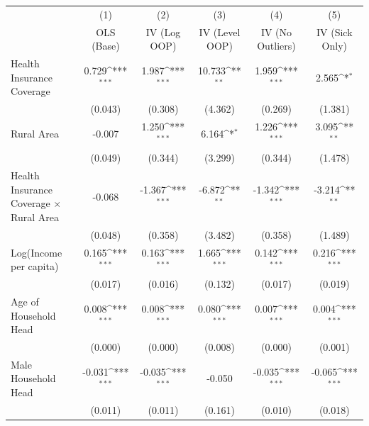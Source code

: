 {
\def\sym#1{\ifmmode^{#1}\else\(^{#1}\)\fi}
\begin{tabular}{l*{5}{c}}
\hline\hline
                    &\multicolumn{1}{c}{(1)}&\multicolumn{1}{c}{(2)}&\multicolumn{1}{c}{(3)}&\multicolumn{1}{c}{(4)}&\multicolumn{1}{c}{(5)}\\
                    &\multicolumn{1}{c}{OLS (Base)}&\multicolumn{1}{c}{IV (Log OOP)}&\multicolumn{1}{c}{IV (Level OOP)}&\multicolumn{1}{c}{IV (No Outliers)}&\multicolumn{1}{c}{IV (Sick Only)}\\
\hline
Health Insurance Coverage&       0.729\sym{***}&       1.987\sym{***}&      10.733\sym{**} &       1.959\sym{***}&       2.565\sym{*}  \\
                    &     (0.043)         &     (0.308)         &     (4.362)         &     (0.269)         &     (1.381)         \\
[1em]
Rural Area          &      -0.007         &       1.250\sym{***}&       6.164\sym{*}  &       1.226\sym{***}&       3.095\sym{**} \\
                    &     (0.049)         &     (0.344)         &     (3.299)         &     (0.344)         &     (1.478)         \\
[1em]
Health Insurance Coverage $\times$ Rural Area&      -0.068         &      -1.367\sym{***}&      -6.872\sym{**} &      -1.342\sym{***}&      -3.214\sym{**} \\
                    &     (0.048)         &     (0.358)         &     (3.482)         &     (0.358)         &     (1.489)         \\
[1em]
Log(Income per capita)&       0.165\sym{***}&       0.163\sym{***}&       1.665\sym{***}&       0.142\sym{***}&       0.216\sym{***}\\
                    &     (0.017)         &     (0.016)         &     (0.132)         &     (0.017)         &     (0.019)         \\
[1em]
Age of Household Head&       0.008\sym{***}&       0.008\sym{***}&       0.080\sym{***}&       0.007\sym{***}&       0.004\sym{***}\\
                    &     (0.000)         &     (0.000)         &     (0.008)         &     (0.000)         &     (0.001)         \\
[1em]
Male Household Head &      -0.031\sym{***}&      -0.035\sym{***}&      -0.050         &      -0.035\sym{***}&      -0.065\sym{***}\\
                    &     (0.011)         &     (0.011)         &     (0.161)         &     (0.010)         &     (0.018)         \\

\end{tabular}}
